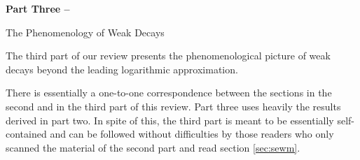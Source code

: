 \skipevenpage

{\Huge\bf
\noindent
Part Three --

\bigskip
\bigskip
\bigskip

\noindent
The Phenomenology of Weak Decays
}

\vfil

\noindent
The third part of our review presents the phenomenological picture
of weak decays beyond the leading logarithmic approximation.

There is essentially a one-to-one correspondence between the sections
in the second and in the third part of this review. Part three
uses heavily the results derived in part two. In spite of this, the
third part is meant to be essentially self-contained and can be followed
without difficulties by those readers who only scanned the material
of the second part and read section \ref{sec:sewm}.

